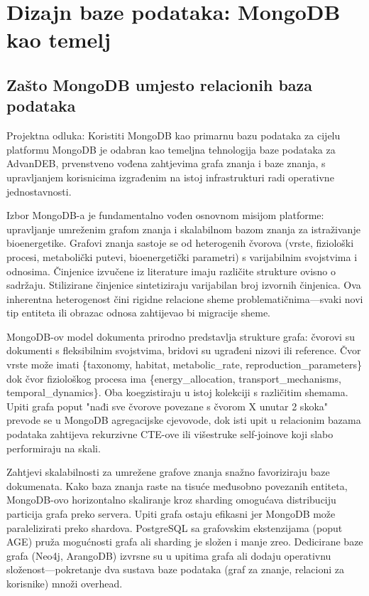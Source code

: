 \documentclass[12pt,a4paper]{article}
\begin{document}
\section{Dizajn baze podataka: MongoDB kao temelj}

\subsection{Zašto MongoDB umjesto relacionih baza podataka}

\begin{rationale}{Projektna odluka: Koristiti MongoDB kao primarnu bazu podataka za cijelu platformu}
MongoDB je odabran kao temeljna tehnologija baze podataka za AdvanDEB, prvenstveno vođena zahtjevima grafa znanja i baze znanja, s upravljanjem korisnicima izgrađenim na istoj infrastrukturi radi operativne jednostavnosti.
\end{rationale}

Izbor MongoDB-a je fundamentalno vođen osnovnom misijom platforme: upravljanje umreženim grafom znanja i skalabilnom bazom znanja za istraživanje bioenergetike. Grafovi znanja sastoje se od heterogenih čvorova (vrste, fiziološki procesi, metabolički putevi, bioenergetički parametri) s varijabilnim svojstvima i odnosima. Činjenice izvučene iz literature imaju različite strukture ovisno o sadržaju. Stilizirane činjenice sintetiziraju varijabilan broj izvornih činjenica. Ova inherentna heterogenost čini rigidne relacione sheme problematičnima—svaki novi tip entiteta ili obrazac odnosa zahtijevao bi migracije sheme.

MongoDB-ov model dokumenta prirodno predstavlja strukture grafa: čvorovi su dokumenti s fleksibilnim svojstvima, bridovi su ugrađeni nizovi ili reference. Čvor vrste može imati \{taxonomy, habitat, metabolic\_rate, reproduction\_parameters\} dok čvor fiziološkog procesa ima \{energy\_allocation, transport\_mechanisms, temporal\_dynamics\}. Oba koegzistiraju u istoj kolekciji s različitim shemama. Upiti grafa poput "nađi sve čvorove povezane s čvorom X unutar 2 skoka" prevode se u MongoDB agregacijske cjevovode, dok isti upit u relacionim bazama podataka zahtijeva rekurzivne CTE-ove ili višestruke self-joinove koji slabo performiraju na skali.

Zahtjevi skalabilnosti za umrežene grafove znanja snažno favoriziraju baze dokumenata. Kako baza znanja raste na tisuće međusobno povezanih entiteta, MongoDB-ovo horizontalno skaliranje kroz sharding omogućava distribuciju particija grafa preko servera. Upiti grafa ostaju efikasni jer MongoDB može paralelizirati preko shardova. PostgreSQL sa grafovskim ekstenzijama (poput AGE) pruža mogućnosti grafa ali sharding je složen i manje zreo. Dedicirane baze grafa (Neo4j, ArangoDB) izvrsne su u upitima grafa ali dodaju operativnu složenost—pokretanje dva sustava baze podataka (graf za znanje, relacioni za korisnike) množi overhead.
\end{document}
